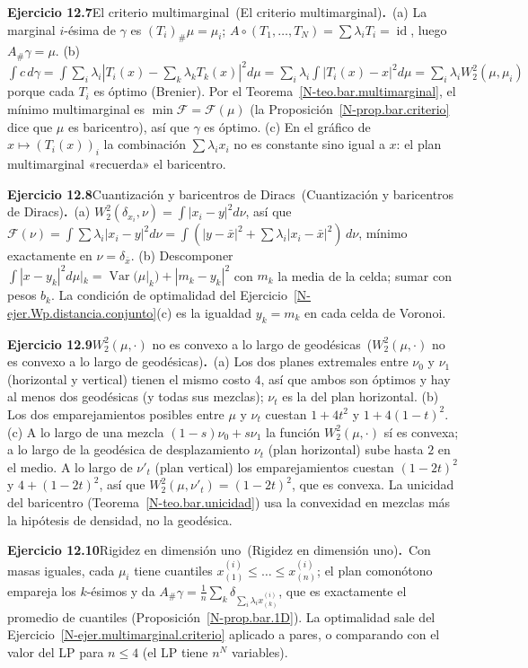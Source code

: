 \documentclass[11pt,a4paper]{amsart}
\newcommand{\id}{\operatorname{id}}
\theoremstyle{remark}
\theoremstyle{definition}
\numberwithin{subsection}{section}
\numberwithin{equation}{section}
\newcommand{\ejlabel}[2]{\par\medskip\noindent\textbf{Ejercicio #1}\ifx\relax#2\relax\else\ (#2)\fi\textbf{.}\ }
\begin{document}
\ejlabel{12.7}{El criterio multimarginal}(a) La marginal $i$-ésima de $\gamma$ es $(T_i)_\#\mu=\mu_i$; $A\circ(T_1,\dots,T_N)=\sum\lambda_iT_i=\id$, luego $A_\#\gamma=\mu$. (b) $\int c\,d\gamma=\int\sum_i\lambda_i|T_i(x)-\sum_k\lambda_kT_k(x)|^2d\mu=\sum_i\lambda_i\int|T_i(x)-x|^2d\mu=\sum_i\lambda_iW_2^2(\mu,\mu_i)$ porque cada $T_i$ es óptimo (Brenier). Por el Teorema~\ref{N-teo.bar.multimarginal}, el mínimo multimarginal es $\min\mathcal F=\mathcal F(\mu)$ (la Proposición~\ref{N-prop.bar.criterio} dice que $\mu$ es baricentro), así que $\gamma$ es óptimo. (c) En el gráfico de $x\mapsto(T_i(x))_i$ la combinación $\sum\lambda_ix_i$ no es constante sino igual a $x$: el plan multimarginal «recuerda» el baricentro.

\ejlabel{12.8}{Cuantización y baricentros de Diracs}(a) $W_2^2(\delta_{x_i},\nu)=\int|x_i-y|^2d\nu$, así que $\mathcal F(\nu)=\int\sum\lambda_i|x_i-y|^2d\nu=\int(|y-\bar x|^2+\sum\lambda_i|x_i-\bar x|^2)\,d\nu$, mínimo exactamente en $\nu=\delta_{\bar x}$. (b) Descomponer $\int|x-y_k|^2d\mu|_k=\operatorname{Var}(\mu|_k)+|m_k-y_k|^2$ con $m_k$ la media de la celda; sumar con pesos $b_k$. La condición de optimalidad del Ejercicio~\ref{N-ejer.Wp.distancia.conjunto}(c) es la igualdad $y_k=m_k$ en cada celda de Voronoi.

\ejlabel{12.9}{$W_2^2(\mu,\cdot)$ no es convexo a lo largo de geodésicas}(a) Los dos planes extremales entre $\nu_0$ y $\nu_1$ (horizontal y vertical) tienen el mismo costo $4$, así que ambos son óptimos y hay al menos dos geodésicas (y todas sus mezclas); $\nu_t$ es la del plan horizontal. (b) Los dos emparejamientos posibles entre $\mu$ y $\nu_t$ cuestan $1+4t^2$ y $1+4(1-t)^2$. (c) A lo largo de una mezcla $(1-s)\nu_0+s\nu_1$ la función $W_2^2(\mu,\cdot)$ sí es convexa; a lo largo de la geodésica de desplazamiento $\nu_t$ (plan horizontal) sube hasta $2$ en el medio. A lo largo de $\nu'_t$ (plan vertical) los emparejamientos cuestan $(1-2t)^2$ y $4+(1-2t)^2$, así que $W_2^2(\mu,\nu'_t)=(1-2t)^2$, que es convexa. La unicidad del baricentro (Teorema~\ref{N-teo.bar.unicidad}) usa la convexidad en mezclas más la hipótesis de densidad, no la geodésica.

\ejlabel{12.10}{Rigidez en dimensión uno}Con masas iguales, cada $\mu_i$ tiene cuantiles $x^{(i)}_{(1)}\le\dots\le x^{(i)}_{(n)}$; el plan comonótono empareja los $k$-ésimos y da $A_\#\gamma=\frac1n\sum_k\delta_{\sum_i\lambda_ix^{(i)}_{(k)}}$, que es exactamente el promedio de cuantiles (Proposición~\ref{N-prop.bar.1D}). La optimalidad sale del Ejercicio~\ref{N-ejer.multimarginal.criterio} aplicado a pares, o comparando con el valor del LP para $n\le4$ (el LP tiene $n^N$ variables).
\end{document}
